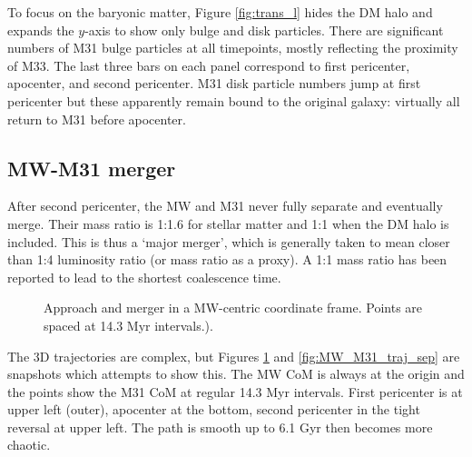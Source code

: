 \documentclass[twocolumn]{aastex63}
\begin{document}
To focus on the baryonic matter, Figure \ref{fig:trans_l} hides the DM halo and expands the $y$-axis to show only bulge and disk particles. There are significant numbers of M31 bulge particles at all timepoints, mostly reflecting the proximity of M33. The last three bars on each panel correspond to first pericenter, apocenter, and second pericenter. M31 disk particle numbers jump at first pericenter but these apparently remain bound to the original galaxy: virtually all return to M31 before apocenter.


\subsection{MW-M31 merger}


After second pericenter, the MW and M31 never fully separate and eventually merge. Their mass ratio is 1:1.6 for stellar matter and 1:1 when the DM halo is included. This is thus a `major merger', which is generally taken to mean closer than 1:4 luminosity ratio (or mass ratio as a proxy). A 1:1 mass ratio has been reported \citep{boylan-kolchin_dynamical_2008, ji_lifetime_2014} to lead to the shortest coalescence time.

\begin{figure}[htb!]
	\caption{Approach and merger in a MW-centric coordinate frame. Points are spaced at 14.3 Myr intervals.).
		\label{fig:MW_M31_traj_time}}
\end{figure}

The 3D trajectories are complex, but Figures \ref{fig:MW_M31_traj_time} and \ref{fig:MW_M31_traj_sep} are snapshots which attempts to show this. The MW CoM is always at the origin and the points show the M31 CoM at regular 14.3 Myr intervals. First pericenter is at upper left (outer), apocenter at the bottom, second pericenter in the tight reversal at upper left. The path is smooth up to 6.1 Gyr then becomes more chaotic.
\end{document}
